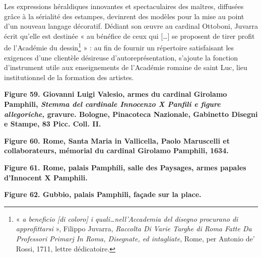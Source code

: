 \documentclass[12pt,twoside,openany]{book}
\begin{document}
Les expressions héraldiques innovantes et spectaculaires des maîtres, diffusées grâce à la sérialité des estampes, devinrent des modèles pour la mise au point d’un nouveau langage décoratif. Dédiant son œuvre au cardinal Ottoboni, Juvarra écrit qu’elle est destinée « au bénéfice de ceux qui […] se proposent de tirer profit de l’Académie du dessin\footnote{« \textit{a beneficio [di coloro] i quali…nell’Accademia del disegno procurano di approfittarsi} », Filippo Juvarra,\textit{ Raccolta Di Varie Targhe di Roma Fatte Da Professori Primarj In Roma, Disegnate, ed intagliate}, Rome, per Antonio de’ Rossi, 1711, lettre dédicatoire.} » : au fin de fournir un répertoire satisfaisant les exigences d’une clientèle désireuse d’autoreprésentation, s’ajoute la fonction d’instrument utile aux enseignements de l’Académie romaine de saint Luc, lieu institutionnel de la formation des artistes.

\begin{center}
\par\small \textbf{Figure 59. Giovanni Luigi Valesio, armes du cardinal Girolamo Pamphili, \textit{Stemma del cardinale Innocenzo X Panfili e figure allegoriche, }gravure. Bologne, Pinacoteca Nazionale, Gabinetto Disegni e Stampe, 83 Picc. Coll. II.}
\end{center}

\begin{center}
\par\small \textbf{Figure 60. Rome, Santa Maria in Vallicella, Paolo Maruscelli et collaborateurs, mémorial du cardinal Girolamo Pamphili, 1634.}
\end{center}

\begin{center}
\par\small \textbf{Figure 61. Rome, palais Pamphili, salle des Paysages, armes papales d’Innocent X Pamphili.}
\end{center}

\begin{center}
\par\small \textbf{Figure 62. Gubbio, palais Pamphili, façade sur la place.}
\end{center}
\end{document}
